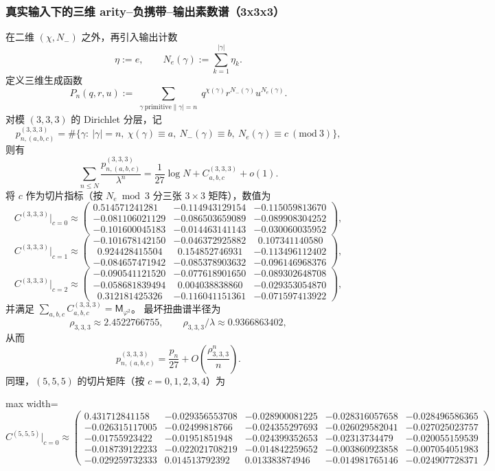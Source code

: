 \subsubsection{真实输入下的三维 arity--负携带--输出素数谱（3x3x3）}\label{app:real-input-40-arity-prime-spectrum-3d}
在二维 $(\chi,N_-)$ 之外，再引入输出计数
\[
\eta:=e,\qquad N_e(\gamma):=\sum_{k=1}^{|\gamma|}\eta_k.
\]
定义三维生成函数
\[
P_n(q,r,u):=\sum_{\substack{\gamma\ \mathrm{primitive}\|\gamma|=n}} q^{\chi(\gamma)}r^{N_-(\gamma)}u^{N_e(\gamma)}.
\]
对模 $(3,3,3)$ 的 Dirichlet 分层，记
\[
p_{n,(a,b,c)}^{(3,3,3)}
=\#\{\gamma:\ |\gamma|=n,\ \chi(\gamma)\equiv a,\ N_-(\gamma)\equiv b,\ N_e(\gamma)\equiv c\ (\mathrm{mod}\ 3)\},
\]
则有
\[
\sum_{n\le N}\frac{p_{n,(a,b,c)}^{(3,3,3)}}{\lambda^n}
=\frac{1}{27}\log N+C_{a,b,c}^{(3,3,3)}+o(1).
\]
将 $c$ 作为切片指标（按 $N_e\bmod 3$ 分三张 $3\times 3$ 矩阵），数值为
\[
C^{(3,3,3)}\big|_{c=0}\approx
\begin{pmatrix}
0.514571241281 & -0.114943129154 & -0.115059813670\\
-0.081106021129 & -0.086503659089 & -0.089908304252\\
-0.101600045183 & -0.014463141143 & -0.030060035952
\end{pmatrix},
\]
\[
C^{(3,3,3)}\big|_{c=1}\approx
\begin{pmatrix}
-0.101678142150 & -0.046372925882 & \ \ 0.107341140580\\
\ \ 0.924428415504 & \ \ 0.154852746931 & -0.113496112402\\
-0.084657471942 & -0.085378903632 & -0.096146968376
\end{pmatrix},
\]
\[
C^{(3,3,3)}\big|_{c=2}\approx
\begin{pmatrix}
-0.090541121520 & -0.077618901650 & -0.089302648708\\
-0.058681839494 & \ \ 0.004038838860 & -0.029353054870\\
\ \ 0.312181425326 & -0.116041151361 & -0.071597413922
\end{pmatrix},
\]
并满足 $\sum_{a,b,c}C_{a,b,c}^{(3,3,3)}=\mathsf{M}_{\varphi^2}$。
最坏扭曲谱半径为
\[
\rho_{3,3,3}\approx 2.4522766755,\qquad \rho_{3,3,3}/\lambda\approx 0.9366863402,
\]
从而
\[
p_{n,(a,b,c)}^{(3,3,3)}=\frac{p_n}{27}+O\!\left(\frac{\rho_{3,3,3}^n}{n}\right).
\]
同理，$(5,5,5)$ 的切片矩阵（按 $c=0,1,2,3,4$）为
\begin{center}
\begin{adjustbox}{max width=\linewidth}
\(
C^{(5,5,5)}\big|_{c=0}\approx
\begin{pmatrix}
0.431712841158 & -0.029356553708 & -0.028900081225 & -0.028316057658 & -0.028496586365\\
-0.026315117005 & -0.02499818766 & -0.024355297693 & -0.026029582041 & -0.027025023757\\
-0.01755923422 & -0.01951851948 & -0.024399352653 & -0.02313734479 & -0.020055159539\\
-0.018739122233 & -0.022021708219 & -0.014842259652 & -0.003860923858 & -0.007054051983\\
-0.029259732333 & 0.014513792392 & 0.013383874946 & -0.014981765146 & -0.024907728371
\end{pmatrix}
\)
\end{adjustbox}
\end{center}
